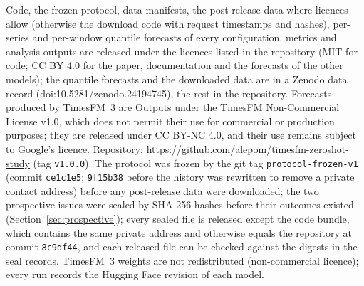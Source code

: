Code, the frozen protocol, data manifests, the post-release data where licences allow (otherwise the download code with request timestamps and hashes), per-series and per-window quantile forecasts of every configuration, metrics and analysis outputs are released under the licences listed in the repository (MIT for code; CC BY 4.0 for the paper, documentation and the forecasts of the other models); the quantile forecasts and the downloaded data are in a Zenodo data record (doi:10.5281/zenodo.24194745), the rest in the repository. Forecasts produced by TimesFM~3 are Outputs under the TimesFM Non-Commercial License v1.0, which does not permit their use for commercial or production purposes; they are released under CC BY-NC 4.0, and their use remains subject to Google's licence. Repository: \url{https://github.com/alepom/timesfm-zeroshot-study} (tag \texttt{v1.0.0}). The protocol was frozen by the git tag \texttt{protocol-frozen-v1} (commit \texttt{ce1c1e5}; \texttt{9f15b38} before the history was rewritten to remove a private contact address) before any post-release data were downloaded; the two prospective issues were sealed by SHA-256 hashes before their outcomes existed (Section~\ref{sec:prospective}); every sealed file is released except the code bundle, which contains the same private address and otherwise equals the repository at commit \texttt{8c9df44}, and each released file can be checked against the digests in the seal records. TimesFM~3 weights are not redistributed (non-commercial licence); every run records the Hugging Face revision of each model.
